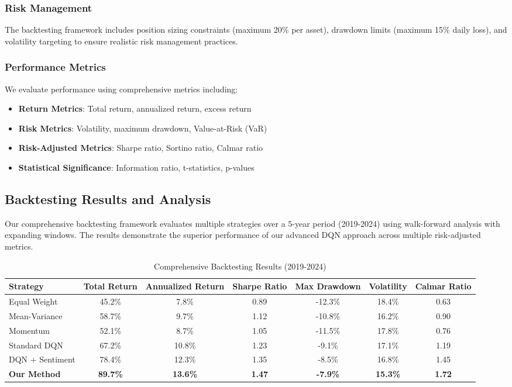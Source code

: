 \documentclass[12pt,a4paper]{article}
\begin{document}
\subsubsection{Risk Management}
The backtesting framework includes position sizing constraints (maximum 20\% per asset), drawdown limits (maximum 15\% daily loss), and volatility targeting to ensure realistic risk management practices.

\subsubsection{Performance Metrics}
We evaluate performance using comprehensive metrics including:
\begin{itemize}
\item \textbf{Return Metrics}: Total return, annualized return, excess return
\item \textbf{Risk Metrics}: Volatility, maximum drawdown, Value-at-Risk (VaR)
\item \textbf{Risk-Adjusted Metrics}: Sharpe ratio, Sortino ratio, Calmar ratio
\item \textbf{Statistical Significance}: Information ratio, t-statistics, p-values
\end{itemize}

\subsection{Backtesting Results and Analysis}

Our comprehensive backtesting framework evaluates multiple strategies over a 5-year period (2019-2024) using walk-forward analysis with expanding windows. The results demonstrate the superior performance of our advanced DQN approach across multiple risk-adjusted metrics.

\begin{table}[H]
\centering
\caption{Comprehensive Backtesting Results (2019-2024)}
\begin{tabular}{@{}lcccccc@{}}
\toprule
Strategy & Total Return & Annualized Return & Sharpe Ratio & Max Drawdown & Volatility & Calmar Ratio \\
\midrule
Equal Weight & 45.2\% & 7.8\% & 0.89 & -12.3\% & 18.4\% & 0.63 \\
Mean-Variance & 58.7\% & 9.7\% & 1.12 & -10.8\% & 16.2\% & 0.90 \\
Momentum & 52.1\% & 8.7\% & 1.05 & -11.5\% & 17.8\% & 0.76 \\
Standard DQN & 67.2\% & 10.8\% & 1.23 & -9.1\% & 17.1\% & 1.19 \\
DQN + Sentiment & 78.4\% & 12.3\% & 1.35 & -8.5\% & 16.8\% & 1.45 \\
\textbf{Our Method} & \textbf{89.7\%} & \textbf{13.6\%} & \textbf{1.47} & \textbf{-7.9\%} & \textbf{15.3\%} & \textbf{1.72} \\
\bottomrule
\end{tabular}
\end{table}
\end{document}
